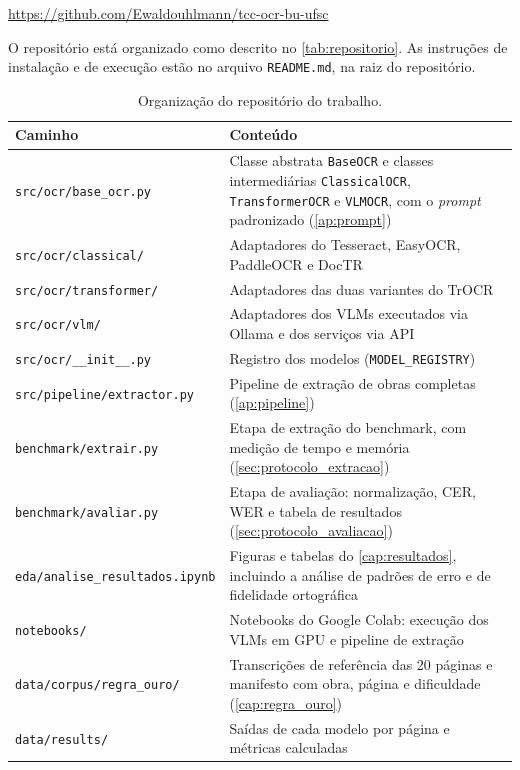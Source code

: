 \documentclass[noabntexcite,oneside]{ufsc-thesis-rn46-2019}
\begin{document}
\begin{apendicesenv}
\begin{center}
\url{https://github.com/Ewaldouhlmann/tcc-ocr-bu-ufsc}
\end{center}

O repositório está organizado como descrito no \autoref{tab:repositorio}. As
instruções de instalação e de execução estão no arquivo \texttt{README.md}, na raiz do
repositório.

\begin{table}[htb]
\centering
\caption{Organização do repositório do trabalho.}
\label{tab:repositorio}
\renewcommand{\arraystretch}{1.3}
{\small
\begin{tabular}{L{5.6cm} L{8.6cm}}
\hline
\textbf{Caminho} & \textbf{Conteúdo} \\
\hline
\texttt{src/ocr/base\_ocr.py} & Classe abstrata \texttt{BaseOCR} e classes intermediárias
  \texttt{ClassicalOCR}, \texttt{TransformerOCR} e \texttt{VLMOCR}, com o \textit{prompt}
  padronizado (\autoref{ap:prompt}) \\
\texttt{src/ocr/classical/} & Adaptadores do Tesseract, EasyOCR, PaddleOCR e DocTR \\
\texttt{src/ocr/transformer/} & Adaptadores das duas variantes do TrOCR \\
\texttt{src/ocr/vlm/} & Adaptadores dos VLMs executados via Ollama e dos serviços via API \\
\texttt{src/ocr/\_\_init\_\_.py} & Registro dos modelos (\texttt{MODEL\_REGISTRY}) \\
\texttt{src/pipeline/extractor.py} & Pipeline de extração de obras completas
  (\autoref{ap:pipeline}) \\
\texttt{benchmark/extrair.py} & Etapa de extração do benchmark, com medição de tempo e
  memória (\autoref{sec:protocolo_extracao}) \\
\texttt{benchmark/avaliar.py} & Etapa de avaliação: normalização, CER, WER e tabela de
  resultados (\autoref{sec:protocolo_avaliacao}) \\
\texttt{eda/analise\_resultados.ipynb} & Figuras e tabelas do \autoref{cap:resultados},
  incluindo a análise de padrões de erro e de fidelidade ortográfica \\
\texttt{notebooks/} & Notebooks do Google Colab: execução dos VLMs em GPU e pipeline de
  extração \\
\texttt{data/corpus/regra\_ouro/} & Transcrições de referência das 20 páginas e manifesto
  com obra, página e dificuldade (\autoref{cap:regra_ouro}) \\
\texttt{data/results/} & Saídas de cada modelo por página e métricas calculadas \\
\hline
\end{tabular}
}
\end{table}

\end{apendicesenv}
\end{document}
